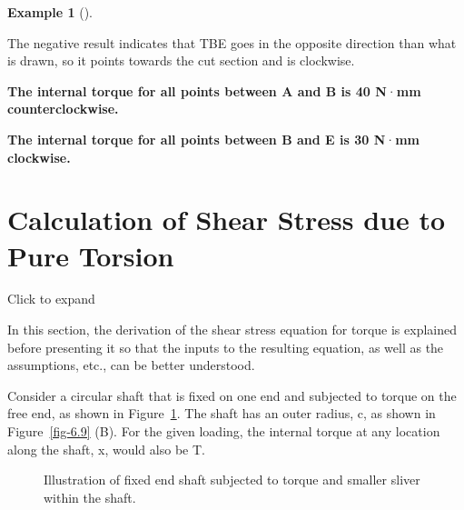 \documentclass[
  letterpaper,
  DIV=11,
  numbers=noendperiod]{scrreprt}
\theoremstyle{definition}
\newtheorem{example}{Example}[chapter]
\theoremstyle{remark}
\begin{document}
\begin{tcolorbox}
\begin{example}[]
\begin{tcolorbox}
The negative result indicates that TBE goes in the opposite direction
than what is drawn, so it points towards the cut section and is
clockwise.

\textbf{The internal torque for all points between A and B is 40
N}·\textbf{mm counterclockwise.}

\textbf{The internal torque for all points between B and E is 30
N}·\textbf{mm clockwise.}

\end{tcolorbox}

\end{example}

\end{tcolorbox}

\section{Calculation of Shear Stress due to Pure Torsion}\label{sec-6.1}

Click to expand

In this section, the derivation of the shear stress equation for torque
is explained before presenting it so that the inputs to the resulting
equation, as well as the assumptions, etc., can be better understood.

Consider a circular shaft that is fixed on one end and subjected to
torque on the free end, as shown in Figure~\ref{fig-6.8}. The shaft has
an outer radius, c, as shown in Figure~\ref{fig-6.9} (B). For the given
loading, the internal torque at any location along the shaft, x, would
also be T.

\begin{figure}


\caption{\label{fig-6.8}Illustration of fixed end shaft subjected to
torque and smaller sliver within the shaft.}

\end{figure}%
\end{document}
